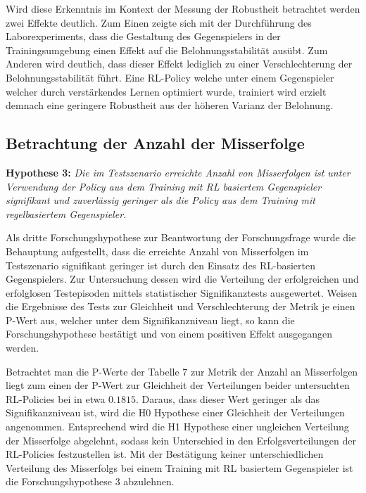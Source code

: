 Wird diese Erkenntnis im Kontext der Messung der Robustheit betrachtet werden zwei Effekte deutlich.
Zum Einen zeigte sich mit der Durchführung des Laborexperiments, dass die Gestaltung des Gegenspielers in der Trainingsumgebung einen Effekt auf die Belohnungsstabilität ausübt.
Zum Anderen wird deutlich, dass dieser Effekt lediglich zu einer Verschlechterung der Belohnungsstabilität führt.
Eine RL-Policy welche unter einem Gegenspieler welcher durch verstärkendes Lernen optimiert wurde, trainiert wird erzielt demnach eine geringere Robustheit aus der höheren Varianz der Belohnung.

\subsection{Betrachtung der Anzahl der Misserfolge}

\textbf{Hypothese 3:}
\textit{Die im Testszenario erreichte Anzahl von Misserfolgen ist unter Verwendung der Policy aus dem Training mit RL basiertem Gegenspieler signifikant und zuverlässig geringer als die Policy aus dem Training mit regelbasiertem Gegenspieler.}

Als dritte Forschungshypothese zur Beantwortung der Forschungsfrage wurde die Behauptung aufgestellt, dass die erreichte Anzahl von Misserfolgen im Testszenario signifikant geringer ist durch den Einsatz des RL-basierten Gegenspielers.
Zur Untersuchung dessen wird die Verteilung der erfolgreichen und erfolglosen Testepisoden mittels statistischer Signifikanztests ausgewertet. 
Weisen die Ergebnisse des Tests zur Gleichheit und Verschlechterung der Metrik je einen P-Wert aus, welcher unter dem Signifikanzniveau liegt, so kann die Forschungshypothese bestätigt und von einem positiven Effekt ausgegangen werden.

Betrachtet man die P-Werte der Tabelle 7 zur Metrik der Anzahl an Misserfolgen liegt zum einen der P-Wert zur Gleichheit der Verteilungen beider untersuchten RL-Policies bei in etwa $0.1815$.
Daraus, dass dieser Wert geringer als das Signifikanzniveau ist, wird die H0 Hypothese einer Gleichheit der Verteilungen angenommen.
Entsprechend wird die H1 Hypothese einer ungleichen Verteilung der Misserfolge abgelehnt, sodass kein Unterschied in den Erfolgsverteilungen der RL-Policies festzustellen ist.
Mit der Bestätigung keiner unterschiedlichen Verteilung des Misserfolgs bei einem Training mit RL basiertem Gegenspieler ist die Forschungshypothese 3 abzulehnen.

